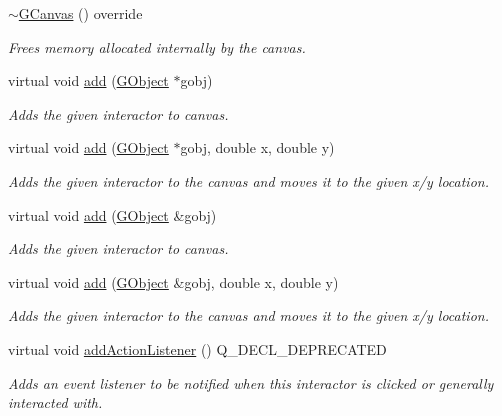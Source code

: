 \begin{DoxyCompactItemize}
\mbox{\hyperlink{classsgl_1_1GCanvas_af7574c14a3a729c56863e9c4ab6a6787}{$\sim$\+G\+Canvas}} () override
\begin{DoxyCompactList}\small\item\em Frees memory allocated internally by the canvas. \end{DoxyCompactList}\item 
virtual void \mbox{\hyperlink{classsgl_1_1GCanvas_afe8277e7b2627513c6f7452fb0b2847d}{add}} (\mbox{\hyperlink{classsgl_1_1GObject}{G\+Object}} $\ast$gobj)
\begin{DoxyCompactList}\small\item\em Adds the given interactor to canvas. \end{DoxyCompactList}\item 
virtual void \mbox{\hyperlink{classsgl_1_1GCanvas_a8bb36f245efc7806414a1339c2befa1c}{add}} (\mbox{\hyperlink{classsgl_1_1GObject}{G\+Object}} $\ast$gobj, double x, double y)
\begin{DoxyCompactList}\small\item\em Adds the given interactor to the canvas and moves it to the given x/y location. \end{DoxyCompactList}\item 
virtual void \mbox{\hyperlink{classsgl_1_1GCanvas_ac732fc2123d7a6d7e2de145fe9bbd8e8}{add}} (\mbox{\hyperlink{classsgl_1_1GObject}{G\+Object}} \&gobj)
\begin{DoxyCompactList}\small\item\em Adds the given interactor to canvas. \end{DoxyCompactList}\item 
virtual void \mbox{\hyperlink{classsgl_1_1GCanvas_a5b11b532869632a6c26b098b0858eac5}{add}} (\mbox{\hyperlink{classsgl_1_1GObject}{G\+Object}} \&gobj, double x, double y)
\begin{DoxyCompactList}\small\item\em Adds the given interactor to the canvas and moves it to the given x/y location. \end{DoxyCompactList}\item 
virtual void \mbox{\hyperlink{classsgl_1_1GInteractor_a02f20ea6edfa0671f31c4c648a253833}{add\+Action\+Listener}} () Q\+\_\+\+D\+E\+C\+L\+\_\+\+D\+E\+P\+R\+E\+C\+A\+T\+ED
\begin{DoxyCompactList}\small\item\em Adds an event listener to be notified when this interactor is clicked or generally interacted with. \end{DoxyCompactList}\item 

\end{DoxyCompactItemize}
